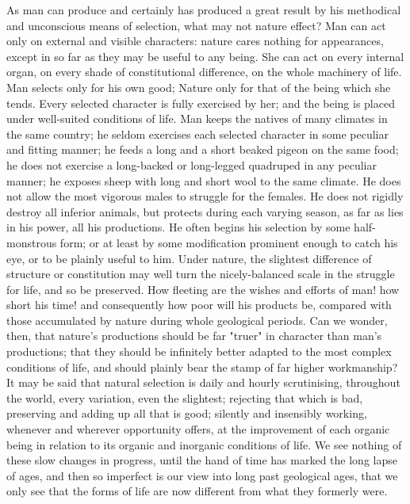 As man can produce and certainly has produced a great result by his methodical and unconscious means of selection, what may not nature effect? Man can act only on external and visible characters: nature cares nothing for appearances, except in so far as they may be useful to any being. She can act on every internal organ, on every shade of constitutional difference, on the whole machinery of life. Man selects only for his own good; Nature only for that of the being which she tends. Every selected character is fully exercised by her; and the being is placed under well-suited conditions of life. Man keeps the natives of many climates in the same country; he seldom exercises each selected character in some peculiar and fitting manner; he feeds a long and a short beaked pigeon on the same food; he does not exercise a long-backed or long-legged quadruped in any peculiar manner; he exposes sheep with long and short wool to the same climate. He does not allow the most vigorous males to struggle for the females. He does not rigidly destroy all inferior animals, but protects during each varying season, as far as lies in his power, all his productions. He often begins his selection by some half-monstrous form; or at least by some modification prominent enough to catch his eye, or to be plainly useful to him. Under nature, the slightest difference of structure or constitution may well turn the nicely-balanced scale in the struggle for life, and so be preserved. How fleeting are the wishes and efforts of man! how short his time! and consequently how poor will his products be, compared with those accumulated by nature during whole geological periods. Can we wonder, then, that nature's productions should be far "truer" in character than man's productions; that they should be infinitely better adapted to the most complex conditions of life, and should plainly bear the stamp of far higher workmanship?
It may be said that natural selection is daily and hourly scrutinising, throughout the world, every variation, even the slightest; rejecting that which is bad, preserving and adding up all that is good; silently and insensibly working, whenever and wherever opportunity offers, at the improvement of each organic being in relation to its organic and inorganic conditions of life. We see nothing of these slow changes in progress, until the hand of time has marked the long lapse of ages, and then so imperfect is our view into long past geological ages, that we only see that the forms of life are now different from what they formerly were.
